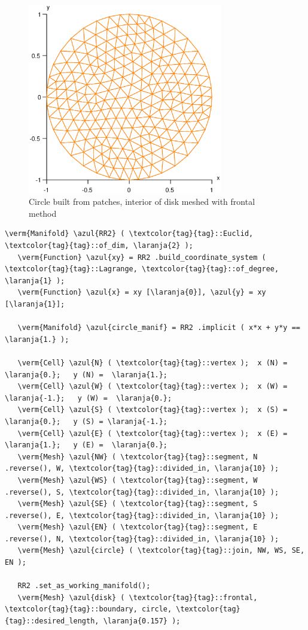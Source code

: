 \begin{figure} \centering
 \includegraphics[width=85mm]{disk-with-tri}
 \caption{Circle built from patches, interior of disk meshed with frontal method}
 \label{\numb section 3.\numb fig 1}
\end{figure}

\begin{Verbatim}[commandchars=\\\{\},formatcom=\small\tt,frame=single,
   label=parag-\ref{\numb section 3.\numb parag 1}.cpp,rulecolor=\color{moldura},
   baselinestretch=0.94,framesep=2mm                                            ]
   \verm{Manifold} \azul{RR2} ( \textcolor{tag}{tag}::Euclid, \textcolor{tag}{tag}::of_dim, \laranja{2} );
   \verm{Function} \azul{xy} = RR2 .build_coordinate_system ( \textcolor{tag}{tag}::Lagrange, \textcolor{tag}{tag}::of_degree, \laranja{1} );
   \verm{Function} \azul{x} = xy [\laranja{0}], \azul{y} = xy [\laranja{1}];
   
   \verm{Manifold} \azul{circle_manif} = RR2 .implicit ( x*x + y*y == \laranja{1.} );
   
   \verm{Cell} \azul{N} ( \textcolor{tag}{tag}::vertex );  x (N) =  \laranja{0.};   y (N) =  \laranja{1.};
   \verm{Cell} \azul{W} ( \textcolor{tag}{tag}::vertex );  x (W) = \laranja{-1.};   y (W) =  \laranja{0.};
   \verm{Cell} \azul{S} ( \textcolor{tag}{tag}::vertex );  x (S) =  \laranja{0.};   y (S) = \laranja{-1.};
   \verm{Cell} \azul{E} ( \textcolor{tag}{tag}::vertex );  x (E) =  \laranja{1.};   y (E) =  \laranja{0.};
   \verm{Mesh} \azul{NW} ( \textcolor{tag}{tag}::segment, N .reverse(), W, \textcolor{tag}{tag}::divided_in, \laranja{10} );
   \verm{Mesh} \azul{WS} ( \textcolor{tag}{tag}::segment, W .reverse(), S, \textcolor{tag}{tag}::divided_in, \laranja{10} );
   \verm{Mesh} \azul{SE} ( \textcolor{tag}{tag}::segment, S .reverse(), E, \textcolor{tag}{tag}::divided_in, \laranja{10} );
   \verm{Mesh} \azul{EN} ( \textcolor{tag}{tag}::segment, E .reverse(), N, \textcolor{tag}{tag}::divided_in, \laranja{10} );
   \verm{Mesh} \azul{circle} ( \textcolor{tag}{tag}::join, NW, WS, SE, EN );
   
   RR2 .set_as_working_manifold();
   \verm{Mesh} \azul{disk} ( \textcolor{tag}{tag}::frontal, \textcolor{tag}{tag}::boundary, circle, \textcolor{tag}{tag}::desired_length, \laranja{0.157} );
\end{Verbatim}

